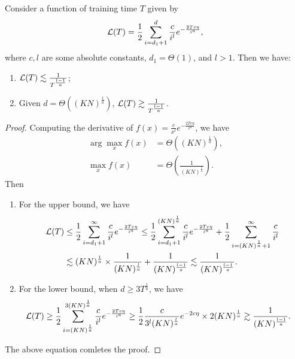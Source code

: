 \begin{lemma} \label{lem:loss-matching-upper-lower-bound}
    Consider a function of training time $T$ given by 
    \begin{align*}
        \mathcal{L}(T) = \frac{1}{2}\sum_{i=d_1+1}^d \frac{c}{i^l} e^{-\frac{2Tc\eta}{i^a}},
    \end{align*}
    where $c, l$ are some absolute constants, $d_1 = \Theta(1)$, and $l>1$. Then we have:
    \begin{enumerate}[leftmargin=*]  
        \item $\mathcal{L}(T)\lesssim\frac{1}{T^{\frac{l-1}{a}}}$;
        \item Given $d = \Theta
        \left((KN)^{\frac{1}{a}}\right)$, $\mathcal{L}(T)\gtrsim\frac{1}{T^{\frac{l-1}{a}}}$.
    \end{enumerate} 
\end{lemma}
\begin{proof}
    Computing the derivative of $f(x) = \frac{c}{x^l}e^{-\frac{2Tc\eta}{x^a}}$, we have
    \begin{align*}
        \arg\max_x f(x)& = \Theta\left((KN)^{\frac{1}{a}}\right), \\
        \max_x f(x)&= \Theta\left(\frac{1}{(KN)^{\frac{l}{a}}}\right).
    \end{align*}
    Then
    \begin{enumerate}[leftmargin=*]  
        \item For the upper bound, we have
        \begin{align*}
            \mathcal{L}(T)&\leq\frac{1}{2}\sum_{i=d_1+1}^{\infty} \frac{c}{i^l} e^{-\frac{2Tc\eta}{i^a}} 
            \leq\frac{1}{2}\sum_{i=d_1+1}^{(KN)^{\frac{1}{a}}} \frac{c}{i^l} e^{-\frac{2Tc\eta}{i^a}}+\frac{1}{2}\sum_{i=(KN)^{\frac{1}{a}}+1}^{\infty} \frac{c}{i^l} \\
            &\lesssim(KN)^{\frac{1}{a}}\times\frac{1}{(KN)^{\frac{l}{a}}}+\frac{1} {(KN)^{\frac{l-1}{a}}} 
            \lesssim\frac{1} {(KN)^{\frac{l-1}{a}}}.          
        \end{align*}
        \item For the lower bound, when $d\geq3T^{\frac{1}{a}}$, we have
        \begin{align*}
            \mathcal{L}(T)&\geq\frac{1}{2}\sum_{i=(KN)^{\frac{1}{a}}}^{3(KN)^{\frac{1}{a}}} \frac{c}{i^l} e^{-\frac{2Tc\eta}{i^a}} \geq \frac{1}{2}\frac{c}{3^l(KN)^{\frac{l}{a}}}e^{-2c\eta} \times 2(KN)^{\frac{1}{a}} \gtrsim \frac{1}{(KN)^{\frac{l-1}{a}}}.
        \end{align*}
    \end{enumerate} 
    The above equation comletes the proof.
\end{proof}
